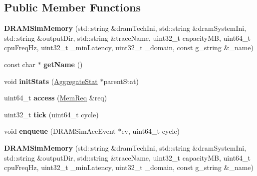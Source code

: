 \subsection*{Public Member Functions}
\begin{DoxyCompactItemize}
\item 
\hypertarget{classDRAMSimMemory_a62c51e3bd12940fd4ab74a8d5b8de1ed}{{\bfseries D\-R\-A\-M\-Sim\-Memory} (std\-::string \&dram\-Tech\-Ini, std\-::string \&dram\-System\-Ini, std\-::string \&output\-Dir, std\-::string \&trace\-Name, uint32\-\_\-t capacity\-M\-B, uint64\-\_\-t cpu\-Freq\-Hz, uint32\-\_\-t \-\_\-min\-Latency, uint32\-\_\-t \-\_\-domain, const g\-\_\-string \&\-\_\-name)}\label{classDRAMSimMemory_a62c51e3bd12940fd4ab74a8d5b8de1ed}

\item 
\hypertarget{classDRAMSimMemory_a712837b00ca1ff452c6b314d0eac70ec}{const char $\ast$ {\bfseries get\-Name} ()}\label{classDRAMSimMemory_a712837b00ca1ff452c6b314d0eac70ec}

\item 
\hypertarget{classDRAMSimMemory_a270e07a2c22746179abb8d1e0ae442f6}{void {\bfseries init\-Stats} (\hyperlink{classAggregateStat}{Aggregate\-Stat} $\ast$parent\-Stat)}\label{classDRAMSimMemory_a270e07a2c22746179abb8d1e0ae442f6}

\item 
\hypertarget{classDRAMSimMemory_aec4b3a71bfa1e021e34d6091c31ffb97}{uint64\-\_\-t {\bfseries access} (\hyperlink{structMemReq}{Mem\-Req} \&req)}\label{classDRAMSimMemory_aec4b3a71bfa1e021e34d6091c31ffb97}

\item 
\hypertarget{classDRAMSimMemory_ae3e9517bb81acd6cc17961f210490db5}{uint32\-\_\-t {\bfseries tick} (uint64\-\_\-t cycle)}\label{classDRAMSimMemory_ae3e9517bb81acd6cc17961f210490db5}

\item 
\hypertarget{classDRAMSimMemory_a71ba63111322818f232cd1efc04a5aff}{void {\bfseries enqueue} (D\-R\-A\-M\-Sim\-Acc\-Event $\ast$ev, uint64\-\_\-t cycle)}\label{classDRAMSimMemory_a71ba63111322818f232cd1efc04a5aff}

\item 
\hypertarget{classDRAMSimMemory_a62c51e3bd12940fd4ab74a8d5b8de1ed}{{\bfseries D\-R\-A\-M\-Sim\-Memory} (std\-::string \&dram\-Tech\-Ini, std\-::string \&dram\-System\-Ini, std\-::string \&output\-Dir, std\-::string \&trace\-Name, uint32\-\_\-t capacity\-M\-B, uint64\-\_\-t cpu\-Freq\-Hz, uint32\-\_\-t \-\_\-min\-Latency, uint32\-\_\-t \-\_\-domain, const g\-\_\-string \&\-\_\-name)}\label{classDRAMSimMemory_a62c51e3bd12940fd4ab74a8d5b8de1ed}


\end{DoxyCompactItemize}

